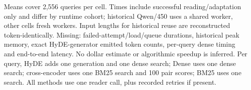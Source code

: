 \begin{table}[!htbp]
\begin{threeparttable}
\begin{tablenotes}\scriptsize\item Means cover 2,556 queries per cell. Times include successful reading/adaptation only and differ by runtime cohort; historical Qwen/450 uses a shared worker, other cells fresh workers. Input lengths for historical reuse are reconstructed token-identically. Missing: failed-attempt/load/queue durations, historical peak memory, exact HyDE-generator emitted token counts, per-query dense timing and end-to-end latency. No dollar estimate or algorithmic speedup is inferred. Per query, HyDE adds one generation and one dense search; Dense uses one dense search; cross-encoder uses one BM25 search and 100 pair scores; BM25 uses one search. All methods use one reader call, plus recorded retries if present.
\end{tablenotes}
\end{threeparttable}
\end{table}
